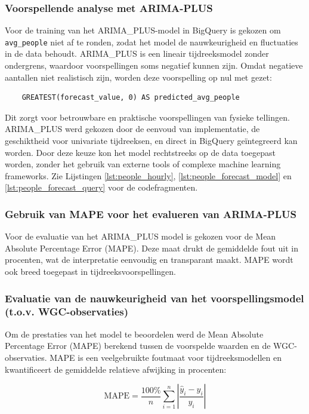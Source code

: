 \subsubsection{Voorspellende analyse met ARIMA-PLUS}
Voor de training van het ARIMA\_PLUS-model in BigQuery is gekozen om \texttt{avg\_people} niet af te ronden, zodat het model de nauwkeurigheid en fluctuaties in de data behoudt. ARIMA\_PLUS is een lineair tijdreeksmodel zonder ondergrens, waardoor voorspellingen soms negatief kunnen zijn. Omdat negatieve aantallen niet realistisch zijn, worden deze voorspelling op nul met gezet:

\begin{verbatim}
    GREATEST(forecast_value, 0) AS predicted_avg_people
\end{verbatim}

Dit zorgt voor betrouwbare en praktische voorspellingen van fysieke tellingen. \\ ARIMA\_PLUS werd gekozen door de eenvoud van implementatie, de geschiktheid voor univariate tijdreeksen, en direct in BigQuery geïntegreerd kan worden. Door deze keuze kon het model rechtstreeks op de  data toegepast worden, zonder het gebruik van externe tools of complexe machine learning frameworks. Zie Lijstingen \ref{lst:people_hourly}, \ref{lst:people_forecast_model} en \ref{lst:people_forecast_query} voor de codefragmenten.

\subsubsection{Gebruik van MAPE voor het evalueren van ARIMA-PLUS}
Voor de evaluatie van het ARIMA\_PLUS model is gekozen voor de Mean Absolute Percentage Error (MAPE). Deze maat drukt de gemiddelde fout uit in procenten, wat de interpretatie eenvoudig en transparant maakt. MAPE wordt ook breed toegepast in tijdreeksvoorspellingen.

\subsubsection{Evaluatie van de nauwkeurigheid van het voorspellingsmodel (t.o.v. WGC-observaties)}
Om de prestaties van het model te beoordelen werd de Mean Absolute Percentage Error (MAPE) berekend tussen de voorspelde waarden en de WGC-observaties. MAPE is een veelgebruikte foutmaat voor tijdreeksmodellen en kwantificeert de gemiddelde relatieve afwijking in procenten:

\[
\mathrm{MAPE} = \frac{100\%}{n} \sum_{i=1}^n \left| \frac{\hat{y}_i - y_i}{y_i} \right|
\]

